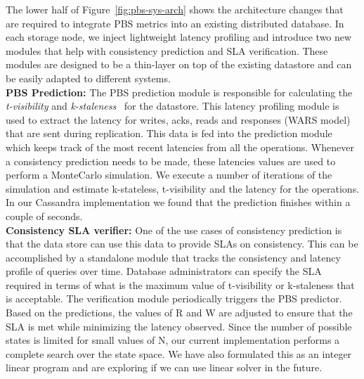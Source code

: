 The lower half of Figure~\ref{fig:pbs-sys-arch} shows the architecture changes
that are required to integrate PBS metrics into an existing distributed
database. In each storage node, we inject lightweight latency profiling and
introduce two new modules that help with consistency prediction and SLA
verification. These modules are designed to be a thin-layer on top of the
existing datastore and can be easily adapted to different systems.\\

\textbf{PBS Prediction:} The PBS prediction module is responsible for
calculating the \textit{t-visibility} and
\textit{k-staleness}~\cite{pbs-vldb2012} for the
datastore. This latency profiling module is used to extract the latency for
writes, acks, reads and responses (WARS model) that are sent during replication.
This data is fed into the prediction module which keeps track of the most recent
latencies from all the operations.  Whenever a consistency prediction needs to
be made, these latencies values are used to perform a MonteCarlo simulation. We
execute a number of iterations of the simulation and estimate k-stateless,
t-visibility and the latency for the operations. In our Cassandra implementation
we found that the prediction finishes within a couple of seconds. \\ 



\textbf{Consistency SLA verifier:} One of the use cases of consistency
prediction is that the data store can use this data to provide SLAs on
consistency. This can be accomplished by a standalone module that tracks the
consistency and latency profile of queries over time. Database administrators
can specify the SLA required in terms of what is the maximum value of
t-visibility or k-staleness that is acceptable. The verification module
periodically triggers the PBS predictor. Based on the predictions, the values of
R and W are adjusted to ensure that the SLA is met while minimizing the latency
observed. Since the number of possible states is limited for small values of N,
our current implementation performs a complete search over the state space.
We have also formulated this as an integer linear program and are exploring if
we can use linear solver in the future.

